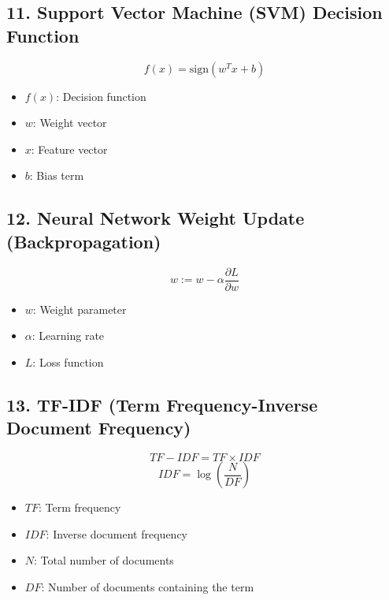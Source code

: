 \documentclass{article}
\begin{document}
\subsection{11. Support Vector Machine (SVM) Decision Function}
\begin{equation}
f(x) = \text{sign}(w^T x + b)
\end{equation}
\begin{itemize}
    \item \(f(x)\): Decision function
    \item \(w\): Weight vector
    \item \(x\): Feature vector
    \item \(b\): Bias term
\end{itemize}

\subsection{12. Neural Network Weight Update (Backpropagation)}
\begin{equation}
w := w - \alpha \frac{\partial L}{\partial w}
\end{equation}
\begin{itemize}
    \item \(w\): Weight parameter
    \item \(\alpha\): Learning rate
    \item \(L\): Loss function
\end{itemize}

\subsection{13. TF-IDF (Term Frequency-Inverse Document Frequency)}
\begin{equation}
TF-IDF = TF \times IDF
\end{equation}
\begin{equation}
IDF = \log \left( \frac{N}{DF} \right)
\end{equation}
\begin{itemize}
    \item \(TF\): Term frequency
    \item \(IDF\): Inverse document frequency
    \item \(N\): Total number of documents
    \item \(DF\): Number of documents containing the term
\end{itemize}
\end{document}
